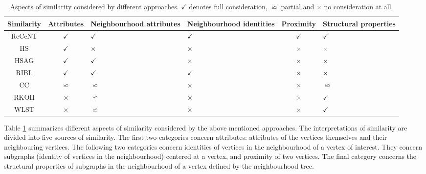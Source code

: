 \begin{table}
    \centering
    
    \caption{Aspects of similarity considered by different approaches. $\checkmark$ denotes full consideration, $\backsimeq$ partial and $\times$ no consideration at all.  }
    \label{tab:Props}
    \begin{tabular}{|c|c|m{2cm}|m{2cm}|c|m{1.5cm}|}
        \hline
        \textbf{Similarity}  & \textbf{Attributes} & \textbf{Neighbourhood attributes} & \textbf{Neighbourhood identities}  & \textbf{Proximity} & \textbf{Structural properties}    \\
        \hline
         ReCeNT                & $\checkmark$        & $\checkmark$                      & $\checkmark$                        & $\checkmark$       & $\checkmark$ \\
         \hline
         HS                  & $\checkmark$        & $\times$                          & $\times$                            & $\times$           & $\times$   \\
         \hline
         HSAG                & $\checkmark$        & $\checkmark$                      & $\times$                            & $\times$           & $\times$   \\
         \hline
         RIBL                & $\checkmark$        & $\checkmark$                      & $\checkmark$                        & $\times$           & $\times$  \\
         \hline
         CC                  & $\backsimeq$        & $\backsimeq$                      & $\times$                            & $\times$           & $\backsimeq$   \\
         \hline
         RKOH                & $\times$            & $\backsimeq$                      & $\times$                            & $\times$           & $\checkmark$ \\
         \hline
         WLST                & $\times$            & $\backsimeq$                      & $\times$                            & $\times$           & $\checkmark$ \\
         \hline
    \end{tabular}
    
\end{table}


Table \ref{tab:Props} summarizes different aspects of similarity considered by the above mentioned approaches.
The interpretations of similarity are divided into five sources of similarity.
The first two categories concern attributes: attributes of the vertices themselves and their neighbouring vertices.
The following two categories concern identities of vertices in the neighbourhood of a vertex of interest.
They concern subgraphs (identity of vertices in the neighbourhood) centered at a vertex, and proximity of two vertices.
The final category concerns the structural properties of subgraphs in the neighbourhood of a vertex defined by the neighbourhood tree.


